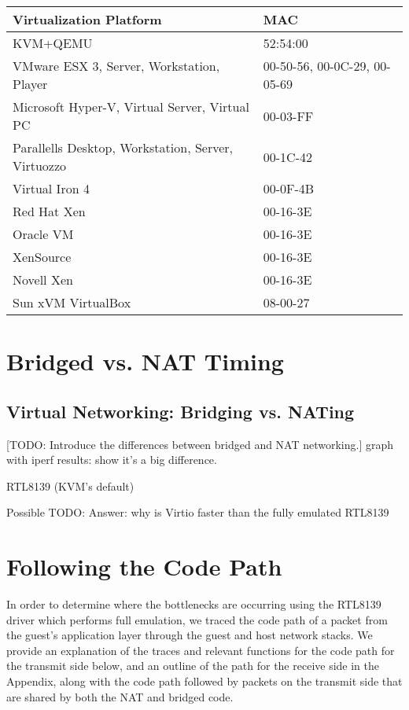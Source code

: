 \documentclass[11pt,pdftex,twocolumn]{article}
\begin{document}
\begin{center}
\begin{table*}[ht]
		\center
		\begin{tabular}{|l|l|}
		\hline
			Virtualization Platform & MAC \\
		\hline
		\hline
			KVM+QEMU & 52:54:00 \\
			VMware ESX 3, Server, Workstation, Player	& 00-50-56, 00-0C-29, 00-05-69 \\
			Microsoft Hyper-V, Virtual Server, Virtual PC	& 00-03-FF \\
			Parallells Desktop, Workstation, Server, Virtuozzo & 00-1C-42 \\
			Virtual Iron 4 & 00-0F-4B \\
			Red Hat Xen	& 00-16-3E \\
			Oracle VM	& 00-16-3E \\
			XenSource	& 00-16-3E \\
			Novell Xen & 00-16-3E \\
			Sun xVM VirtualBox & 08-00-27 \\
		\hline
		\end{tabular}
	\caption{First three octets of default MAC addresses by virtualization platform\footnote{ \emph{(Source:http://www.techrepublic.com/blog/networking/mac-address-scorecard-for-common-virtual-machine-platforms/538)}}}
	\label{tab:macaddrs}
\end{table*}
\end{center}

\section{Bridged vs. NAT Timing}
\label{sec:NFSTiming}	


\subsection{Virtual Networking: Bridging vs. NATing}
\label{subsec:bridgeVsNAT}
[TODO: Introduce the differences between bridged and NAT networking.]
graph with iperf results: show it's a big difference.

RTL8139 (KVM's default)

Possible TODO: Answer: why is Virtio faster than the fully emulated RTL8139

\section{Following the Code Path}
In order to determine where the bottlenecks are occurring using the RTL8139 driver which performs full emulation, we traced the code path of a packet from the guest's application layer through the guest and host network stacks. We provide an explanation of the traces and relevant functions for the code path for the transmit side below, and an outline of the path for the receive side in the Appendix, along with the code path followed by packets on the transmit side that are shared by both the NAT and bridged code. 
\end{document}
